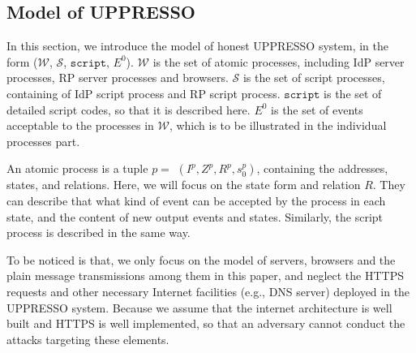 \subsection{Model of UPPRESSO}
In this section, we introduce the model of honest UPPRESSO system, in the form ($\mathcal{W}$, $\mathcal{S}$, $\mathtt{script}$, $E^0$).
$\mathcal{W}$ is the set of atomic processes, including IdP server processes, RP server processes and browsers.
$\mathcal{S}$ is the set of script processes, containing of IdP script process and RP script process.
$\mathtt{script}$ is the set of detailed script codes, so that it is described here.
$E^0$  is the set of events acceptable to the processes in $\mathcal{W}$, which is to be illustrated in the individual processes part.

An atomic process is a tuple $p=$ $(I^p, Z^p, R^p,s_0^p )$, containing the addresses, states, and relations.
Here, we will focus on the state form and relation $R$. They can describe that what kind of event can be accepted by the process in each state, and the content of new output events and states.
Similarly, the script process is described in the same way.


To be noticed is that, we only focus on the model of servers, browsers and the plain message transmissions among them in this paper, and neglect the HTTPS requests and other necessary Internet facilities (e.g., DNS server) deployed in the UPPRESSO system.
Because we assume that the internet architecture is well  built and HTTPS is well implemented, so that an adversary cannot conduct the attacks targeting these elements.


